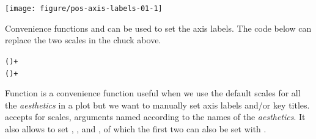 \documentclass[krantz2]{krantz}\usepackage{knitr}%
\begin{document}
\begin{knitrout}\footnotesize
{}\color{fgcolor}\begin{kframe}
\begin{alltt}
\hlstd{(} 
       \hlstd{(}      \hlopt{+}
  \hlstd{()} \hlopt{+}
  \hlstd{()} \hlopt{+}
  \hlstd{(} \hlstd{=} \hlstd{)} \hlopt{+}
  \hlstd{(} \hlstd{=} \hlstd{)} \hlopt{+}
  \hlstd{(} \hlstd{=} \hlstd{)} \hlopt{+}
  \hlstd{(} \hlstd{=} \hlstd{,}
           \hlstd{=} \hlstd{)}
\end{alltt}
\end{kframe}

{\centering \texttt{[image: figure/pos-axis-labels-01-1]} 

}



\end{knitrout}

Convenience functions  and  can be used to set the axis labels. The code below can replace the two scales in the chuck above.

\begin{knitrout}\footnotesize
{}\color{fgcolor}\begin{kframe}
\begin{alltt}
  () +
  () +
\end{alltt}
\end{kframe}
\end{knitrout}

Function  is a convenience function useful when we use the default scales for all the \emph{aesthetics} in a plot but we want to manually set axis labels and/or key titles.  accepts for scales, arguments named according to the names of the \emph{aesthetics}. It also allows to set , ,  and , of which the first two can also be set with .
\end{document}
